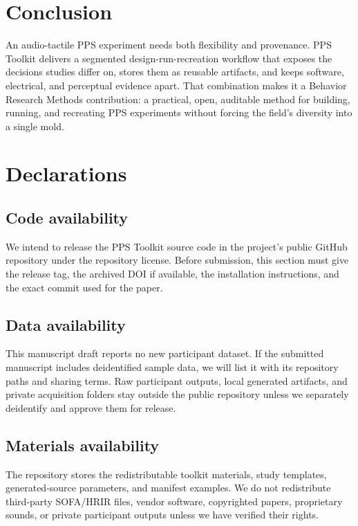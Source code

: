 \documentclass[pdflatex,sn-apa]{sn-jnl}
\newcommand{\toolkit}{PPS Toolkit}
\begin{document}
\section{Conclusion}

An audio-tactile PPS experiment needs both flexibility and provenance. \toolkit{} delivers a segmented design-run-recreation workflow that exposes the decisions studies differ on, stores them as reusable artifacts, and keeps software, electrical, and perceptual evidence apart. That combination makes it a Behavior Research Methods contribution: a practical, open, auditable method for building, running, and recreating PPS experiments without forcing the field's diversity into a single mold.

\section*{Declarations}

\subsection*{Code availability}
We intend to release the PPS Toolkit source code in the project's public GitHub repository under the repository license. Before submission, this section must give the release tag, the archived DOI if available, the installation instructions, and the exact commit used for the paper.

\subsection*{Data availability}
This manuscript draft reports no new participant dataset. If the submitted manuscript includes deidentified sample data, we will list it with its repository paths and sharing terms. Raw participant outputs, local generated artifacts, and private acquisition folders stay outside the public repository unless we separately deidentify and approve them for release.

\subsection*{Materials availability}
The repository stores the redistributable toolkit materials, study templates, generated-source parameters, and manifest examples. We do not redistribute third-party SOFA/HRIR files, vendor software, copyrighted papers, proprietary sounds, or private participant outputs unless we have verified their rights.
\end{document}

